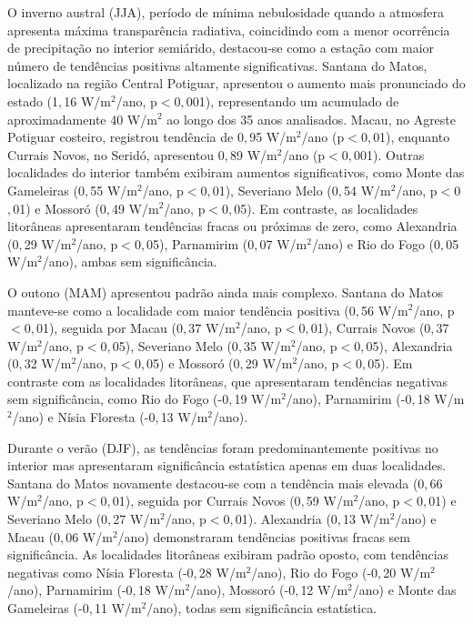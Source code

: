 O inverno austral (JJA), período de mínima nebulosidade quando a atmosfera apresenta máxima transparência radiativa, coincidindo com a menor ocorrência de precipitação no interior semiárido, destacou-se como a estação com maior número de tendências positivas altamente significativas. Santana do Matos, localizado na região Central Potiguar, apresentou o aumento mais pronunciado do estado (1${,}$16 W/m$^2$/ano, p$<$0${,}$001), representando um acumulado de aproximadamente 40 W/m$^2$ ao longo dos 35 anos analisados. Macau, no Agreste Potiguar costeiro, registrou tendência de 0${,}$95 W/m$^2$/ano (p$<$0${,}$01), enquanto Currais Novos, no Seridó, apresentou 0${,}$89 W/m$^2$/ano (p$<$0${,}$001). Outras localidades do interior também exibiram aumentos significativos, como Monte das Gameleiras (0${,}$55 W/m$^2$/ano, p$<$0${,}$01), Severiano Melo (0${,}$54 W/m$^2$/ano, p$<$0${,}$01) e Mossoró (0${,}$49 W/m$^2$/ano, p$<$0${,}$05). Em contraste, as localidades litorâneas apresentaram tendências fracas ou próximas de zero, como Alexandria (0${,}$29 W/m$^2$/ano, p$<$0${,}$05), Parnamirim (0${,}$07 W/m$^2$/ano) e Rio do Fogo (0${,}$05 W/m$^2$/ano), ambas sem significância.

O outono (MAM) apresentou padrão ainda mais complexo. Santana do Matos manteve-se como a localidade com maior tendência positiva (0${,}$56 W/m$^2$/ano, p$<$0${,}$01), seguida por Macau (0${,}$37 W/m$^2$/ano, p$<$0${,}$01), Currais Novos (0${,}$37 W/m$^2$/ano, p$<$0${,}$05), Severiano Melo (0${,}$35 W/m$^2$/ano, p$<$0${,}$05), Alexandria (0${,}$32 W/m$^2$/ano, p$<$0${,}$05) e Mossoró (0${,}$29 W/m$^2$/ano, p$<$0${,}$05). Em contraste com as localidades litorâneas, que apresentaram tendências negativas sem significância, como Rio do Fogo (-0${,}$19 W/m$^2$/ano), Parnamirim (-0${,}$18 W/m$^2$/ano) e Nísia Floresta (-0${,}$13 W/m$^2$/ano).

Durante o verão (DJF), as tendências foram predominantemente positivas no interior mas apresentaram significância estatística apenas em duas localidades. Santana do Matos novamente destacou-se com a tendência mais elevada (0${,}$66 W/m$^2$/ano, p$<$0${,}$01), seguida por Currais Novos (0${,}$59 W/m$^2$/ano, p$<$0${,}$01) e Severiano Melo (0${,}$27 W/m$^2$/ano, p$<$0${,}$01). Alexandria (0${,}$13 W/m$^2$/ano) e Macau (0${,}$06 W/m$^2$/ano) demonstraram tendências positivas fracas sem significância. As localidades litorâneas exibiram padrão oposto, com tendências negativas como Nísia Floresta (-0${,}$28 W/m$^2$/ano), Rio do Fogo (-0${,}$20 W/m$^2$/ano), Parnamirim (-0${,}$18 W/m$^2$/ano), Mossoró (-0${,}$12 W/m$^2$/ano) e Monte das Gameleiras (-0${,}$11 W/m$^2$/ano), todas sem significância estatística.

